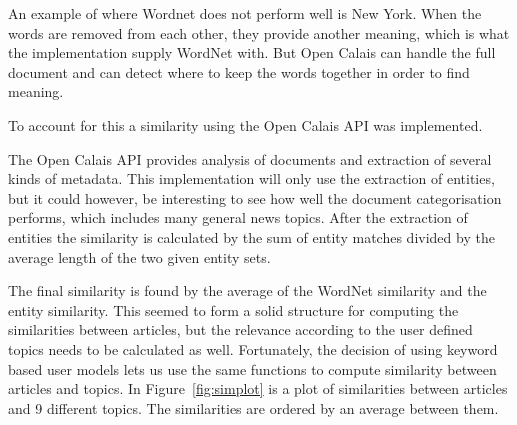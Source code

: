 An example of where Wordnet does not perform well is New York. When the words are removed from each other, they provide another meaning, which is what the implementation supply WordNet with. But Open Calais can handle the full document and can detect where to keep the words together in order to find meaning.

To account for this a similarity using the Open Calais API was implemented.

The Open Calais API provides analysis of documents and extraction of several kinds of metadata. This implementation will only use the extraction of entities, but it could however, be interesting to see how well the document categorisation performs, which includes many general news topics. After the extraction of entities the similarity is calculated by the sum of entity matches divided by the average length of the two given entity sets.

The final similarity is found by the average of the WordNet similarity and the entity similarity. This seemed to form a solid structure for computing the similarities between articles, but the relevance according to the user defined topics needs to be calculated as well. Fortunately, the decision of using keyword based user models lets us use the same functions to compute similarity between articles and topics. In Figure~\ref{fig:simplot} is a plot of similarities between articles and 9 different topics. The similarities are ordered by an average between them.
\begin{figure}[h!tp]
	\myfloatalign
\end{figure}

